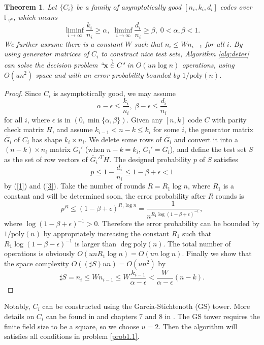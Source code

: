 \documentclass[a4paper, 10pt]{article}
\newtheorem{theorem}{Theorem}[section]  %
\begin{document}
\begin{theorem}\label{mainthm}
    Let $\{C_i\}$ be a family of asymptotically good $[n_i,k_i,d_i]$ codes over $\mathbb{F}_{q^u}$, which means \[\liminf_{i\to \infty} \frac{k_i}{n_i}\ge \alpha,\;\liminf_{i\to \infty}\frac{d_i}{n_i}\ge \beta,\;0<\alpha,\beta<1.\] We further assume there is a constant $W$ such that $n_i \le Wn_{i-1}$ for all $i$. By using generator matrices of $C_i$ to construct nice test sets, Algorithm \ref{alg:deter} can solve the decision problem  “$\mathbf{x}\overset{?}{\in} C$" in $O(un\log n)$ operations, using $O(un^2)$ space and with an error probability bounded by $1/\mathrm{poly}(n)$.
\end{theorem}
\begin{proof}
Since $C_i$ is asymptotically good, we may assume
\begin{equation}
\alpha-\epsilon \le \frac{k_i}{n_i},\;\beta-\epsilon\le \frac{d_i}{n_i}\label{3}    
\end{equation}
for all $i$, where $\epsilon$ is in $(0,\min\{\alpha,\beta\})$. Given any $[n,k]$ code $C$ with parity check matrix $H$, and assume $k_{i-1}<n-k\le k_i$ for some $i$, the generator matrix $\bar{G}_i$ of $C_i$ has shape $k_i\times n_i$. We delete some rows of $\bar{G}_i$ and convert it into a $(n-k)\times n_i$ matrix $\bar{G}_i'$ (when $n-k=k_i$, $\bar{G}_i'=\bar{G}_i$), and define the test set $S$ as the set of row vectors of $\bar{G}_i'^TH$. The designed probability $p$ of $S$ satisfies
\[
p\le 1-\frac{d_i}{n_i}\le 1-\beta +\epsilon <1
\]
by (\ref{1}) and (\ref{3}). Take the number of rounds $R=R_1\log n$, where $R_1$ is a constant and will be determined soon, the error probability after $R$ rounds is 
\[
p^R\le (1-\beta+\epsilon)^{R_1\log n} =\frac{1}{n^{R_1\log(1-\beta+\epsilon)^{-1}}},
\]
where $\log(1-\beta+\epsilon)^{-1}>0$. Therefore the error probability can be bounded by $1/\mathrm{poly}(n)$ by appropriately increasing the constant $R_1$ such that $R_1\log (1-\beta-\epsilon)^{-1}$ is larger than $\deg \mathrm{poly}(n)$. The total number of operations is obviously $O(unR_1\log n)=O(un\log n)$. Finally we show that the space complexity $O((\sharp S)un)=O(un^2)$ by
\[
\sharp S=n_i\le Wn_{i-1}\le W\frac{k_{i-1}}{\alpha-\epsilon}<\frac{W}{\alpha -\epsilon}(n-k).
\]
    
\end{proof}
Notably, $C_i$ can be constructed using the Garcia-Stichtenoth (GS) tower. More details on $C_i$ can be found in \cite{Garcia1995} and chapters 7 and 8 in \cite{Stichtenoth2009}. The GS tower requires the finite field size to be a square, so we choose $u=2$. Then the algorithm will satisfies all conditions in problem \ref{prob1.1}.
\end{document}
